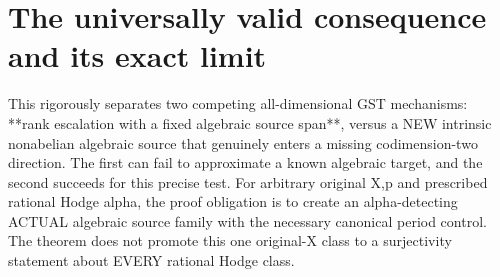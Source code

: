 \documentclass[11pt]{article}
\begin{document}
\section{The universally valid consequence and its exact limit}
This rigorously separates two competing all-dimensional
GST mechanisms: **rank escalation with a fixed algebraic
source span**, versus a NEW intrinsic nonabelian algebraic
source that genuinely enters a missing codimension-two
direction. The first can fail to approximate a known
algebraic target, and the second succeeds for this precise
test. For arbitrary original X,p and prescribed rational
Hodge alpha, the proof obligation is to create an
alpha-detecting ACTUAL algebraic source family with
the necessary canonical period control. The theorem
does not promote this one original-X class to a
surjectivity statement about EVERY rational Hodge class.
\end{document}
